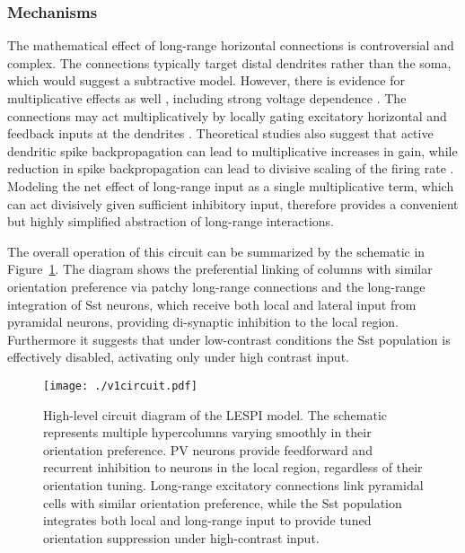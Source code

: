 \subsubsection{Mechanisms}

The mathematical effect of long-range horizontal connections is
controversial and complex.  The connections typically target distal
dendrites rather than the soma, which would suggest a subtractive
model.  However, there is evidence for multiplicative effects as well
\citep{Wilson2012}, including strong voltage dependence
\citep{Hirsch1991}.  The connections may act multiplicatively by locally gating
excitatory horizontal and feedback inputs at the dendrites
\citep{Ma2011, Gentet2012}. Theoretical studies also suggest that
active dendritic spike backpropagation can lead to multiplicative
increases in gain, while reduction in spike backpropagation can lead
to divisive scaling of the firing rate \citep{Mehaffey2005}. Modeling
the net effect of long-range input as a single multiplicative term, which
can act divisively given sufficient inhibitory input, therefore
provides a convenient but highly simplified abstraction of
long-range interactions.

The overall operation of this circuit can be summarized by the
schematic in Figure~\ref{circuit_diagram}. The diagram shows the
preferential linking of columns with similar orientation preference
via patchy long-range connections and the long-range integration of
Sst neurons, which receive both local and lateral input from pyramidal
neurons, providing di-synaptic inhibition to the local
region. Furthermore it suggests that under low-contrast conditions the
Sst population is effectively disabled, activating only under high
contrast input.

\begin{figure}
	\centering
	\texttt{[image: ./v1circuit.pdf]}
	\caption[High-level circuit diagram of the LESPI
      model.]{High-level circuit diagram of the LESPI model. The
      schematic represents multiple hypercolumns varying smoothly in
      their orientation preference. PV neurons provide feedforward and
      recurrent inhibition to neurons in the local region,
      regardless of their orientation tuning. Long-range excitatory
      connections link pyramidal cells with similar orientation
      preference, while the Sst population integrates both local and
      long-range input to provide tuned orientation suppression under
      high-contrast input.}
    \label{circuit_diagram}
\end{figure}

